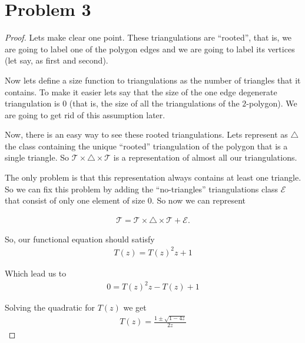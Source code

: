﻿\chapter{Problem 3}

\begin{proof}
    Lets make clear one point. These triangulations are ``rooted'', that is, we are going to label one of the polygon edges and
    we are going to label its vertices (let say, as first and second).\pn

    Now lets define a size function to triangulations as the number of triangles that it contains.
    To make it easier lets say that the size of the one edge degenerate triangulation is $0$ (that is, the size of all the triangulations
    of the $2$-polygon). We are going to get rid of this assumption later.\pn
    
    Now, there is an easy way to see these rooted triangulations. Lets represent as $\triangle$ the class containing the unique ``rooted'' 
    triangulation of the polygon that is a single triangle. So $\mathcal{T} \times \triangle \times \mathcal{T}$ is a representation of almost 
		all our triangulations.\pn
		
    The only problem is that this representation always contains at least one triangle. So we can fix this problem by adding the ``no-triangles''
    triangulations class $\mathcal{E}$ that consist of only one element of size $0$. So now we can represent 
    
    \begin{align}
        \mathcal{T} = \mathcal{T} \times \triangle \times \mathcal{T} + \mathcal{E}.
    \end{align}\pn
    
    So, our functional equation should satisfy
    \begin{align}
        T(z) = T(z)^2 z + 1
    \end{align}\pn
    
    Which lead us to
    \begin{align}
        0 = T(z)^2 z - T(z) + 1
    \end{align}\pn
    
    Solving the quadratic for $T(z)$ we get
    \begin{align}
        T(z) = \frac{1 \pm \sqrt{1 - 4z}}{2z}
    \end{align}\pn
    

\end{proof}
